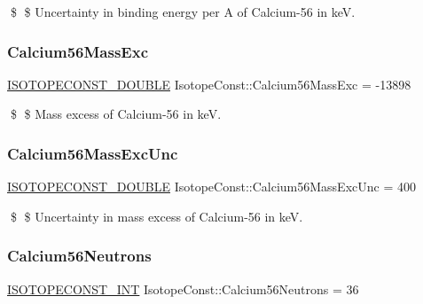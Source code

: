 \$ \$ Uncertainty in binding energy per A of Calcium-\/56 in keV. \mbox{\label{group___isotope_const-_calcium-_ca56_ga9387ccd36f8b3db05954245c2389c5da}} 
\subsubsection{\texorpdfstring{Calcium56\+Mass\+Exc}{Calcium56MassExc}}
{\footnotesize\ttfamily \mbox{\hyperlink{group___isotope_const-_macros_ga8f45a7272ce02c0b4c65c44636ed719a}{I\+S\+O\+T\+O\+P\+E\+C\+O\+N\+S\+T\+\_\+\+D\+O\+U\+B\+LE}} Isotope\+Const\+::\+Calcium56\+Mass\+Exc = -\/13898}

\$ \$ Mass excess of Calcium-\/56 in keV. \mbox{\label{group___isotope_const-_calcium-_ca56_ga07f2f2dd698088c9c36319db9d322f17}} 
\subsubsection{\texorpdfstring{Calcium56\+Mass\+Exc\+Unc}{Calcium56MassExcUnc}}
{\footnotesize\ttfamily \mbox{\hyperlink{group___isotope_const-_macros_ga8f45a7272ce02c0b4c65c44636ed719a}{I\+S\+O\+T\+O\+P\+E\+C\+O\+N\+S\+T\+\_\+\+D\+O\+U\+B\+LE}} Isotope\+Const\+::\+Calcium56\+Mass\+Exc\+Unc = 400}

\$ \$ Uncertainty in mass excess of Calcium-\/56 in keV. \mbox{\label{group___isotope_const-_calcium-_ca56_gaedcc9d55aacb2dbd2abefe5e55d9f530}} 
\subsubsection{\texorpdfstring{Calcium56\+Neutrons}{Calcium56Neutrons}}
{\footnotesize\ttfamily \mbox{\hyperlink{group___isotope_const-_macros_ga5f18360b3e99483a35c32d789e62621c}{I\+S\+O\+T\+O\+P\+E\+C\+O\+N\+S\+T\+\_\+\+I\+NT}} Isotope\+Const\+::\+Calcium56\+Neutrons = 36}

